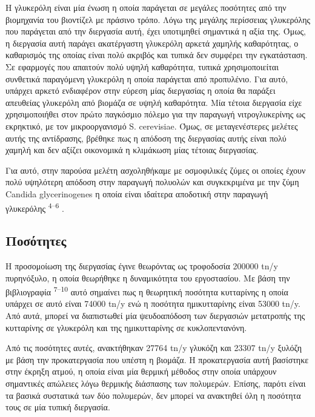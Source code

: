 \documentclass[11pt]{article}
\begin{document}
Η γλυκερόλη είναι μία ένωση η οποία παράγεται σε μεγάλες ποσότητες από την βιομηχανία του βιοντίζελ με πράσινο τρόπο. Λόγω της μεγάλης περίσσειας γλυκερόλης που παράγεται από την διεργασία αυτή, έχει υποτιμηθεί σημαντικά η αξία της. Όμως, η διεργασία αυτή παράγει ακατέργαστη γλυκερόλη αρκετά χαμηλής καθαρότητας, ο καθαρισμός της οποίας είναι πολύ ακριβός και τυπικά δεν συμφέρει την εγκατάσταση. Σε εφαρμογές που απαιτούν πολύ υψηλή καθαρότητα, τυπικά χρησιμοποιείται συνθετικά παραγόμενη γλυκερόλη η οποία παράγεται από προπυλένιο. Για αυτό, υπάρχει αρκετό ενδιαφέρον στην εύρεση μίας διεργασίας η οποία θα παράξει απευθείας γλυκερόλη από βιομάζα σε υψηλή καθαρότητα. Μία τέτοια διεργασία είχε χρησιμοποιήθει στον πρώτο παγκόσμιο πόλεμο για την παραγωγή νιτρογλυκερίνης ως εκρηκτικό, με τον μικροοργανισμό S. cerevisiae. Όμως, σε μεταγενέστερες μελέτες αυτής της αντίδρασης, βρέθηκε πως η απόδοση της διεργασίας αυτής είναι πολύ χαμηλή και δεν αξίζει οικονομικά η κλιμάκωση μίας τέτοιας διεργασίας.

Για αυτό, στην παρούσα μελέτη ασχοληθήκαμε με οσμοφιλικές ζύμες οι οποίες έχουν πολύ υψηλότερη απόδοση στην παραγωγή πολυολών και συγκεκριμένα με την ζύμη Candida glycerinogenes η οποία είναι ιδαίτερα αποδοτική στην παραγωγή γλυκερόλης \textsuperscript{4–6} .

\subsection{Ποσότητες}
\label{sec:orgdc1b713}
Η προσομοίωση της διεργασίας έγινε θεωρόντας ως τροφοδοσία 200000 tn/y πυρηνόξυλο, η οποία θεωρήθηκε η δυναμικότητα του εργοστασίου. Με βάση την βιβλιογραφία \textsuperscript{7–10} αυτό σημαίνει πως η θεωρητική ποσότητα κυτταρίνης η οποία υπάρχει σε αυτό είναι 74000 tn/y ενώ η ποσότητα ημικυτταρίνης είναι 53000 tn/y. Από αυτά, μπορεί να διαπιστωθεί μία ψευδοαπόδοση των διεργασιών μετατροπής της κυτταρίνης σε γλυκερόλη και της ημικυτταρίνης σε κυκλοπεντανόνη.

Από τις ποσότητες αυτές, ανακτήθηκαν 27764 tn/y γλυκόζη και 23307 tn/y ξυλόζη με βάση την προκατεργασία που υπέστη η βιομάζα. Η προκατεργασία αυτή βασίστηκε στην έκρηξη ατμού, η οποία είναι μία θερμική μέθοδος στην οποία υπάρχουν σημαντικές απώλειες λόγω θερμικής διάσπασης των πολυμερών. Επίσης, παρότι είναι τα βασικά συστατικά των δύο πολυμερών, δεν μπορεί να ανακτηθεί όλη η ποσότητα τους σε μία τυπική διεργασία.
\end{document}
